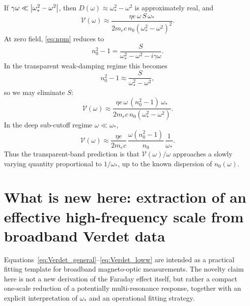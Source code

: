 \documentclass[11pt,a4paper]{article}
\begin{document}
        If \(\gamma\omega\ll \abs{\omega_\ast^2-\omega^2}\), then \(D(\omega)\approx \omega_\ast^2-\omega^2\) is approximately real, and
        \begin{equation}
            \mathcal{V}(\omega)
            \approx
            \frac{\eta e\,\omega\,S\,\omega_\ast}
            {2m_e c\,n_0(\omega_\ast^2-\omega^2)^2}.
            \label{eq:Verdet_g0}
        \end{equation}
        At zero field, \eqref{eq:npm} reduces to
        \begin{equation}
            n_0^2-1=\frac{S}{\omega_\ast^2-\omega^2-i\gamma\omega}.
        \end{equation}
        In the transparent weak-damping regime this becomes
        \begin{equation}
            n_0^2-1\approx \frac{S}{\omega_\ast^2-\omega^2},
        \end{equation}
        so we may eliminate \(S\):
        \begin{equation}
            \boxed{
                \mathcal{V}(\omega)
                \approx
                \frac{\eta e\,\omega\,(n_0^2-1)\,\omega_\ast}
                {2m_e c\,n_0(\omega_\ast^2-\omega^2)}
            }.
            \label{eq:Verdet_elimS}
        \end{equation}
        In the deep sub-cutoff regime \(\omega\ll \omega_\ast\),
        \begin{equation}
            \boxed{
                \mathcal{V}(\omega)
                \approx
                \frac{\eta e}{2m_e c}\,
                \frac{\omega(n_0^2-1)}{n_0}\,
                \frac{1}{\omega_\ast}
            }.
            \label{eq:Verdet_loww}
        \end{equation}
        Thus the transparent-band prediction is that \(\mathcal{V}(\omega)/\omega\) approaches a slowly varying quantity proportional to \(1/\omega_\ast\), up to the known dispersion of \(n_0(\omega)\).
    
    \section{What is new here: extraction of an effective high-frequency scale from broadband Verdet data}
    
    Equations~\eqref{eq:Verdet_general}--\eqref{eq:Verdet_loww} are intended as a practical fitting template for broadband magneto-optic measurements. The novelty claim here is not a new derivation of the Faraday effect itself, but rather a compact one-scale reduction of a potentially multi-resonance response, together with an explicit interpretation of $\omega_\ast$ and an operational fitting strategy.
    
\end{document}
